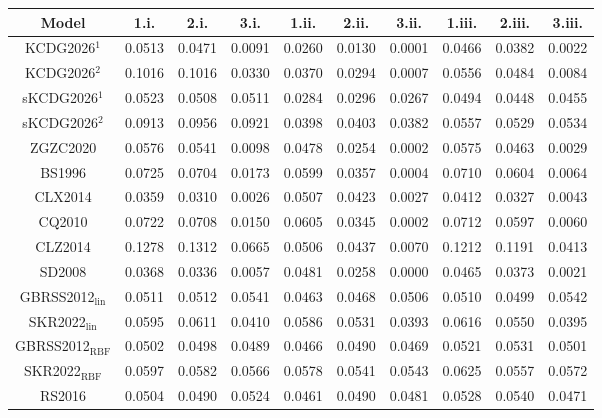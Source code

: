 
\begin{tabular}{cccccccccc}
\hline
Model & 1.i. & 2.i. & 3.i. & 1.ii. & 2.ii. & 3.ii. & 1.iii. & 2.iii. & 3.iii.\\
\hline
KCDG2026$^1$ & 0.0513 & 0.0471 & 0.0091 & 0.0260 & 0.0130 & 0.0001 & 0.0466 & 0.0382 & 0.0022\\
KCDG2026$^2$ & 0.1016 & 0.1016 & 0.0330 & 0.0370 & 0.0294 & 0.0007 & 0.0556 & 0.0484 & 0.0084\\
sKCDG2026$^1$ & 0.0523 & 0.0508 & 0.0511 & 0.0284 & 0.0296 & 0.0267 & 0.0494 & 0.0448 & 0.0455\\
sKCDG2026$^2$ & 0.0913 & 0.0956 & 0.0921 & 0.0398 & 0.0403 & 0.0382 & 0.0557 & 0.0529 & 0.0534\\
ZGZC2020 & 0.0576 & 0.0541 & 0.0098 & 0.0478 & 0.0254 & 0.0002 & 0.0575 & 0.0463 & 0.0029\\

BS1996 & 0.0725 & 0.0704 & 0.0173 & 0.0599 & 0.0357 & 0.0004 & 0.0710 & 0.0604 & 0.0064\\
CLX2014 & 0.0359 & 0.0310 & 0.0026 & 0.0507 & 0.0423 & 0.0027 & 0.0412 & 0.0327 & 0.0043\\
CQ2010 & 0.0722 & 0.0708 & 0.0150 & 0.0605 & 0.0345 & 0.0002 & 0.0712 & 0.0597 & 0.0060\\
CLZ2014 & 0.1278 & 0.1312 & 0.0665 & 0.0506 & 0.0437 & 0.0070 & 0.1212 & 0.1191 & 0.0413\\
SD2008 & 0.0368 & 0.0336 & 0.0057 & 0.0481 & 0.0258 & 0.0000 & 0.0465 & 0.0373 & 0.0021\\

GBRSS2012$_{\text{lin}}$ & 0.0511 & 0.0512 & 0.0541 & 0.0463 & 0.0468 & 0.0506 & 0.0510 & 0.0499 & 0.0542\\
SKR2022$_{\text{lin}}$ & 0.0595 & 0.0611 & 0.0410 & 0.0586 & 0.0531 & 0.0393 & 0.0616 & 0.0550 & 0.0395\\
GBRSS2012$_{\text{RBF}}$ & 0.0502 & 0.0498 & 0.0489 & 0.0466 & 0.0490 & 0.0469 & 0.0521 & 0.0531 & 0.0501\\
SKR2022$_{\text{RBF}}$ & 0.0597 & 0.0582 & 0.0566 & 0.0578 & 0.0541 & 0.0543 & 0.0625 & 0.0557 & 0.0572\\
RS2016 & 0.0504 & 0.0490 & 0.0524 & 0.0461 & 0.0490 & 0.0481 & 0.0528 & 0.0540 & 0.0471\\
\hline
\end{tabular}
